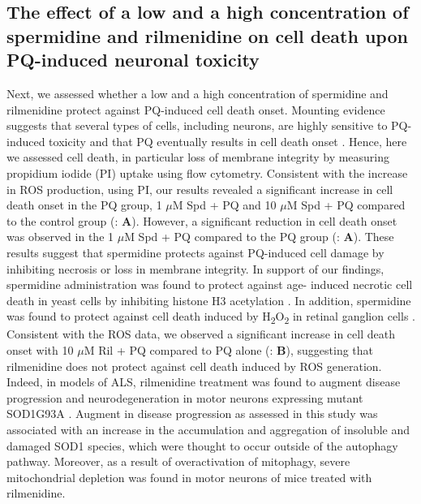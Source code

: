 \subsection{The effect of a low and a high concentration of spermidine and rilmenidine on cell death upon PQ-induced neuronal toxicity}
Next, we assessed whether a low and a high concentration of spermidine and rilmenidine protect against PQ-induced cell death onset. Mounting evidence suggests that several types of cells, including neurons, are highly sensitive to PQ-induced toxicity and that PQ eventually results in cell death onset \citep{Chun2001,Gonzalez-Polo2004,Niso-Santano2006}. Hence, here we assessed cell death, in particular loss of membrane integrity by measuring propidium iodide (PI) uptake using flow cytometry. Consistent with the increase in ROS production, using PI, our results revealed a significant increase in cell death onset in the PQ group, 1 $\mu$M Spd + PQ and 10 $\mu$M Spd + PQ compared to the control group (: \textbf{A}). However, a significant reduction in cell death onset was observed in the 1 $\mu$M Spd + PQ compared to the PQ group (: \textbf{A}). These results suggest that spermidine protects against PQ-induced cell damage by inhibiting necrosis or loss in membrane integrity. In support of our findings, spermidine administration was found to protect against age- induced necrotic cell death in yeast cells by inhibiting histone H3 acetylation \citep{Eisenberg2009}. In addition, spermidine was found to protect against cell death induced by H\textsubscript{2}O\textsubscript{2} in retinal ganglion cells \citep{Guo2011}. Consistent with the ROS data, we observed a significant increase in cell death onset with 10 $\mu$M Ril + PQ compared to PQ alone (: \textbf{B}), suggesting that rilmenidine does not protect against cell death induced by ROS generation. Indeed, in models of ALS, rilmenidine treatment was found to augment disease progression and neurodegeneration in motor neurons expressing mutant SOD1G93A \citep{Perera2018}. Augment in disease progression as assessed in this study was associated with an increase in the accumulation and aggregation of insoluble and damaged SOD1 species, which were thought to occur outside of the autophagy pathway. Moreover, as a result of overactivation of mitophagy, severe mitochondrial depletion was found in motor neurons of mice treated with rilmenidine.

